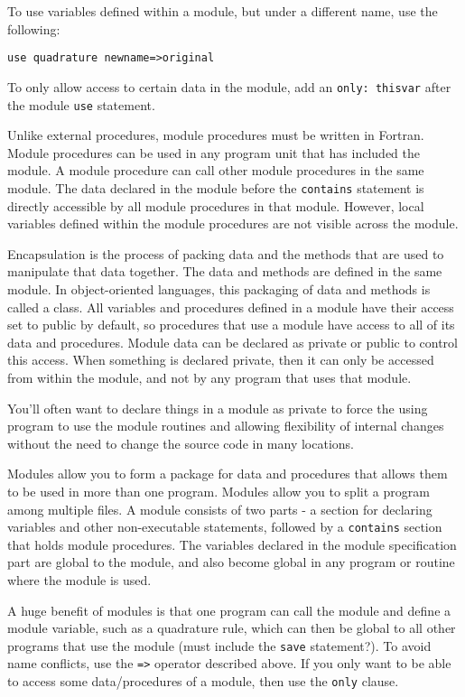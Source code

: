 \documentclass[10pt]{article}
\begin{document}
To use variables defined within a module, but under a different name, use the following:

\begin{lstlisting}
use quadrature newname=>original
\end{lstlisting}

To only allow access to certain data in the module, add an {\tt only: thisvar} after the module {\tt use} statement.

Unlike external procedures, module procedures must be written in Fortran. Module procedures can be used in any program unit that has included the module. A module procedure can call other module procedures in the same module. The data declared in the module before the {\tt contains} statement is directly accessible by all module procedures in that module. However, local variables defined within the module procedures are not visible across the module.

Encapsulation is the process of packing data and the methods that are used to manipulate that data together. The data and methods are defined in the same module. In object-oriented languages, this packaging of data and methods is called a class. All variables and procedures defined in a module have their access set to public by default, so procedures that use a module have access to all of its data and procedures. Module data can be declared as private or public to control this access. When something is declared private, then it can only be accessed from within the module, and not by any program that uses that module. 

You'll often want to declare things in a module as private to force the using program to use the module routines and allowing flexibility of internal changes without the need to change the source code in many locations.

Modules allow you to form a package for data and procedures that allows them to be used in more than one program. Modules allow you to split a program among multiple files. A module consists of two parts - a section for declaring variables and other non-executable statements, followed by a {\tt contains} section that holds module procedures. The variables declared in the module specification part are global to the module, and also become global in any program or routine where the module is used. 

A huge benefit of modules is that one program can call the module and define a module variable, such as a quadrature rule, which can then be global to all other programs that use the module (must include the {\tt save} statement?). To avoid name conflicts, use the {\tt =>} operator described above. If you only want to be able to access some data/procedures of a module, then use the {\tt only} clause.
\end{document}
